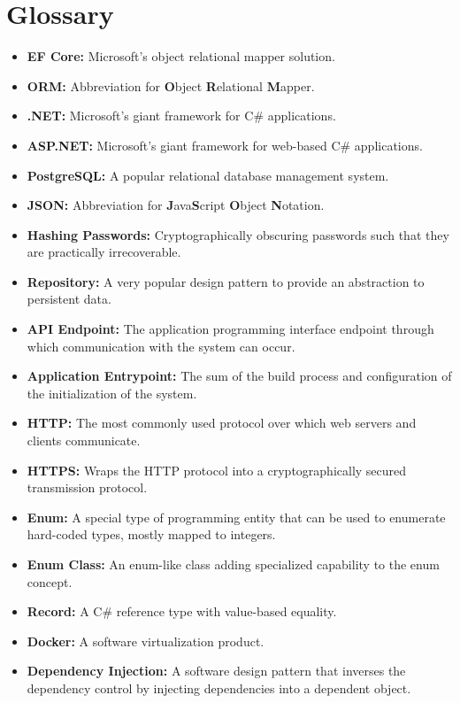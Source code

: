 \documentclass[a4paper, 12pt, titlepage]{article}
\begin{document}
  \pagebreak
  \section{Glossary}

  \begin{itemize}
    \item \textbf{EF Core:} Microsoft's object relational mapper solution.
    \item \textbf{ORM:} Abbreviation for \textbf{O}bject \textbf{R}elational \textbf{M}apper.
    \item \textbf{.NET:} Microsoft's giant framework for C\# applications.
    \item \textbf{ASP.NET:} Microsoft's giant framework for web-based C\# applications.
    \item \textbf{PostgreSQL:} A popular relational database management system.
    \item \textbf{JSON:} Abbreviation for \textbf{J}ava\textbf{S}cript \textbf{O}bject \textbf{N}otation.
    \item \textbf{Hashing Passwords:} Cryptographically obscuring passwords such that they are practically irrecoverable.
    \item \textbf{Repository:} A very popular design pattern to provide an abstraction to persistent data.
    \item \textbf{API Endpoint:} The application programming interface endpoint through which communication with the system can occur.
    \item \textbf{Application Entrypoint:} The sum of the build process and configuration of the initialization of the system.
    \item \textbf{HTTP:} The most commonly used protocol over which web servers and clients communicate.
    \item \textbf{HTTPS:} Wraps the HTTP protocol into a cryptographically secured transmission protocol.
    \item \textbf{Enum:} A special type of programming entity that can be used to enumerate hard-coded types, mostly mapped to integers.
    \item \textbf{Enum Class:} An enum-like class adding specialized capability to the enum concept.
    \item \textbf{Record:} A C\# reference type with value-based equality.
    \item \textbf{Docker:} A software virtualization product.
    \item \textbf{Dependency Injection:} A software design pattern that inverses the dependency control by injecting dependencies into a dependent object.
  \end{itemize}
\end{document}
